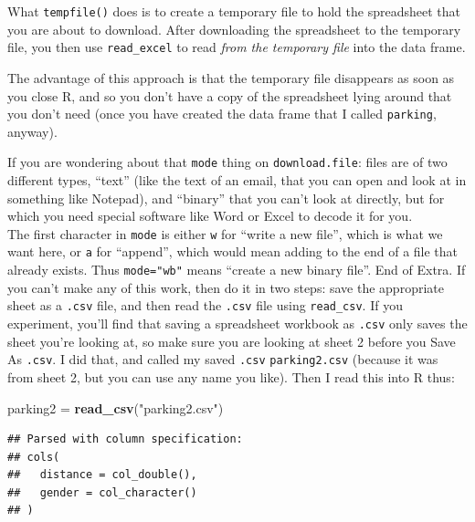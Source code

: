 \documentclass[]{tufte-book}
\newenvironment{Shaded}{}{}
\newcommand{\KeywordTok}[1]{\textcolor[rgb]{0.00,0.44,0.13}{\textbf{#1}}}
\newcommand{\NormalTok}[1]{#1}
\newcommand{\StringTok}[1]{\textcolor[rgb]{0.25,0.44,0.63}{#1}}
\theoremstyle{definition}
\theoremstyle{definition}
\theoremstyle{definition}
\theoremstyle{remark}
\begin{document}
What \texttt{tempfile()} does is to create a temporary file to hold the
spreadsheet that you are about to download. After downloading the
spreadsheet to the temporary file, you then use \texttt{read\_excel} to
read \emph{from the temporary file} into the data frame.

The advantage of this approach is that the temporary file disappears as
soon as you close R, and so you don't have a copy of the spreadsheet
lying around that you don't need (once you have created the data frame
that I called \texttt{parking}, anyway).

If you are wondering about that \texttt{mode} thing on
\texttt{download.file}: files are of two different types, ``text'' (like
the text of an email, that you can open and look at in something like
Notepad), and ``binary'' that you can't look at directly, but for which
you need special software like Word or Excel to decode it for you.
\\
The first character in \texttt{mode} is either \texttt{w} for ``write a
new file'', which is what we want here, or \texttt{a} for ``append'',
which would mean adding to the end of a file that already exists. Thus
\texttt{mode="wb"} means ``create a new binary file''. End of Extra. If
you can't make any of this work, then do it in two steps: save the
appropriate sheet as a \texttt{.csv} file, and then read the
\texttt{.csv} file using \texttt{read\_csv}. If you experiment, you'll
find that saving a spreadsheet workbook as \texttt{.csv} only saves the
sheet you're looking at, so make sure you are looking at sheet 2 before
you Save As \texttt{.csv}. I did that, and called my saved \texttt{.csv}
\texttt{parking2.csv} (because it was from sheet 2, but you can use any
name you like). Then I read this into R thus:

\begin{Shaded}
\begin{Highlighting}[]
\NormalTok{parking2 =}\StringTok{ }\KeywordTok{read_csv}\NormalTok{(}\StringTok{"parking2.csv"}\NormalTok{)}
\end{Highlighting}
\end{Shaded}

\begin{verbatim}
## Parsed with column specification:
## cols(
##   distance = col_double(),
##   gender = col_character()
## )
\end{verbatim}
\end{document}
